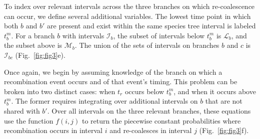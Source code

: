 \documentclass[11pt]{article}
\begin{document}
To index over relevant intervals across the three branches on which re-coalescence
can occur, we define several additional variables. The lowest time point in which both 
$b$ and $b'$ are present and exist within the same species tree interval is labeled 
$t_b^m$. For a branch $b$ with intervals $\mathcal{I}_b$, the subset of intervals 
below $t_b^m$ is $\mathcal{L}_b$, and the subset above is $\mathcal{M}_b$. 
The union of the sets of intervals on branches $b$ and $c$ is $\mathcal{I}_{bc}$
(Fig.~\ref{fig:fig3}e).

Once again, we begin by assuming knowledge of the branch on which a 
recombination event occurs and of that event's timing. This problem can be broken 
into two distinct cases: when $t_r$ occurs below $t_b^m$, and when it 
occurs above $t_b^m$. The former requires integrating over additional 
intervals on $b$ that are not shared with $b'$. Over all intervals
on the three relevant branches, these equations use the function 
$f(i,j)$ to return the piecewise constant probabilities where recombination 
occurs in interval $i$ and re-coalesces in interval $j$ (Fig.~\ref{fig:fig3}f).




\end{document}
